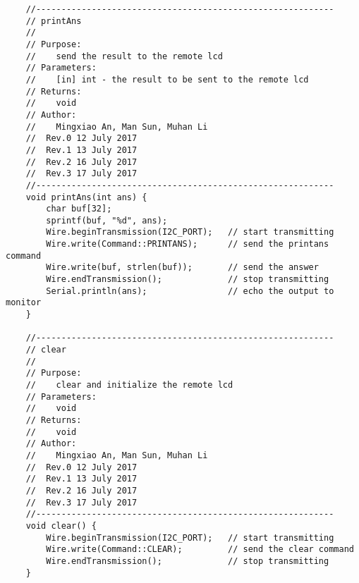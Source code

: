\begin{verbatim}
    //-----------------------------------------------------------  
    // printAns 
    //  
    // Purpose:  
    //    send the result to the remote lcd 
    // Parameters:  
    //    [in] int - the result to be sent to the remote lcd  
    // Returns:  
    //    void  
    // Author:  
    //    Mingxiao An, Man Sun, Muhan Li
    //  Rev.0 12 July 2017
    //  Rev.1 13 July 2017
    //  Rev.2 16 July 2017
    //  Rev.3 17 July 2017
    //----------------------------------------------------------- 
    void printAns(int ans) {
        char buf[32];
        sprintf(buf, "%d", ans);
        Wire.beginTransmission(I2C_PORT);   // start transmitting
        Wire.write(Command::PRINTANS);      // send the printans command
        Wire.write(buf, strlen(buf));       // send the answer
        Wire.endTransmission();             // stop transmitting
        Serial.println(ans);                // echo the output to monitor
    }

    //-----------------------------------------------------------  
    // clear
    //  
    // Purpose:  
    //    clear and initialize the remote lcd
    // Parameters:  
    //    void
    // Returns:  
    //    void  
    // Author:  
    //    Mingxiao An, Man Sun, Muhan Li
    //  Rev.0 12 July 2017
    //  Rev.1 13 July 2017
    //  Rev.2 16 July 2017
    //  Rev.3 17 July 2017
    //----------------------------------------------------------- 
    void clear() {
        Wire.beginTransmission(I2C_PORT);   // start transmitting
        Wire.write(Command::CLEAR);         // send the clear command
        Wire.endTransmission();             // stop transmitting
    }


\end{verbatim}
